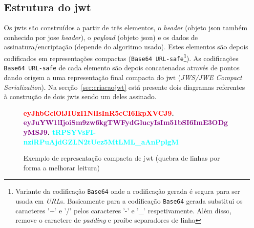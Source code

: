 \subsection{Estrutura do \acrshort{jwt}}

Os \acrshort{jwt}s são construídos a partir de três elementos, o \textit{header} (objeto \acrshort{json} também conhecido por \acrshort{jose} \textit{header}), o \textit{payload} (objeto \acrshort{json}) e os dados de assinatura/encriptação (depende do algoritmo usado). Estes elementos são depois codificados em representações compactas (\texttt{Base64 URL-safe}\footnote{Variante da codificação \texttt{Base64} onde a codificação gerada é segura para ser usada em \textit{URL}s. Basicamente para a codificação \texttt{Base64} gerada substitui os caracteres '+' e '/' pelos caracteres '-' e '\_' respetivamente. Além disso, remove o caractere de \textit{padding} e proíbe separadores de linha}). As codificações \texttt{Base64 URL-safe} de cada elemento são depois concatenadas através de pontos dando origem a uma representação final compacta do \acrshort{jwt} (\textit{JWS/JWE Compact Serialization}). Na secção~\ref{sec:criacaojwt} está presente dois diagramas referentes à construção de dois \acrshort{jwt}s sendo um deles assinado.

\begin{figure}[H]
    \centering
    \textbf{\textcolor{red}{eyJhbGciOiJIUzI1NiIsInR5cCI6IkpXVCJ9}.
        \textcolor{purple}{eyJuYW1lIjoiSm9zw6kgTWFydGlucyIsIm51bSI6ImE3ODgyMSJ9}.
        \textcolor{cyan}{tRPSYVsFI-nziRPuAjdGZLN2tUez5MtLML\_aAnPplgM}
    }
    \caption{Exemplo de representação compacta de \acrshort{jwt} (quebra de linhas por forma a melhorar leitura)}\label{fig:exemjwt}
\end{figure}

